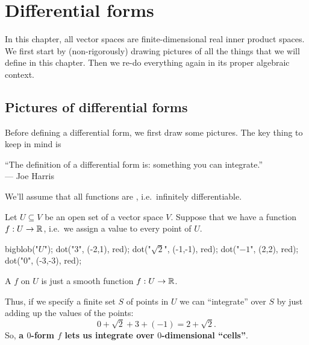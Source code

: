 \chapter{Differential forms}
In this chapter, all vector spaces are finite-dimensional
real inner product spaces.
We first start by (non-rigorously) drawing pictures
of all the things that we will define in this chapter.
Then we re-do everything again in its proper algebraic context.

\section{Pictures of differential forms}
Before defining a differential form,
we first draw some pictures.
The key thing to keep in mind is
\begin{moral}
	``The definition of a differential form is:
	something you can integrate.'' \\ --- Joe Harris
\end{moral}

We'll assume that all functions are ,
i.e.\ infinitely differentiable.

Let $U \subseteq V$ be an open set of a vector space $V$.
Suppose that we have a function $f : U \to \mathbb R$, i.e.\
we assign a value to every point of $U$.
\begin{center}
	\begin{asy}
		bigblob("$U$");
		dot("$3$", (-2,1), red);
		dot("$\sqrt2$", (-1,-1), red);
		dot("$-1$", (2,2), red);
		dot("$0$", (-3,-3), red);
	\end{asy}
\end{center}
\begin{definition}
	A  $f$ on $U$ is just a smooth function $f : U \to \mathbb R$.
\end{definition}
Thus, if we specify a finite set $S$ of points in $U$
we can ``integrate'' over $S$ by just adding up the values
of the points:
\[ 0 + \sqrt 2 + 3 + (-1) = 2 + \sqrt2. \]
So, \textbf{a $0$-form $f$ lets us integrate over $0$-dimensional ``cells''}.


